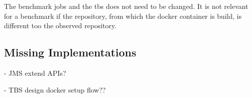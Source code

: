The benchmark jobs and the \acl{tbs} does not need to be changed.
It is not relevant for a benchmark if the repository, from which the docker container is build, is different too the observed repository.


\subsection{Missing Implementations}
- JMS extend APIs?

- TBS design docker setup flow??


